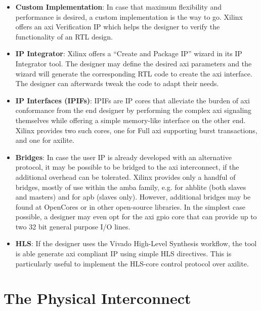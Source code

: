 \begin{itemize}
\item	\textbf{Custom Implementation}:
	In case that maximum flexibility and performance is desired,
	a custom implementation is the way to go.
	Xilinx offers an \gls{axi} Verification IP
	which helps the designer to verify the functionality of an RTL design.

\item	\textbf{IP Integrator}:
	Xilinx offers a ``Create and Package IP'' wizard in its IP Integrator tool.
	The designer may define the desired \gls{axi} parameters
	and the wizard will generate the corresponding RTL code
	to create the \gls{axi} interface.
	The designer can afterwards tweak the code to adapt their needs.

\item	\textbf{IP Interfaces (IPIFs)}:
	IPIFs are IP cores that alleviate the burden of \gls{axi} conformance
	from the end designer by performing the complex \gls{axi} signaling
	themselves while offering a simple memory-like interface on the other end.
	Xilinx provides two such cores, one for Full \gls{axi}
	supporting \gls{burst} transactions, and one for \gls{axilite}.

\item	\textbf{Bridges}: In case the user IP is already developed with an alternative protocol,
	it may be possible to be bridged to the \gls{axi} interconnect,
	if the additional overhead can be tolerated.
	Xilinx provides only a handful of bridges, mostly of use within the \gls{amba} family,
	e.g. for \gls{ahblite} (both slaves and masters) and for \gls{apb} (slaves only).
	However, additional bridges may be found at OpenCores or in other open-source libraries.
	In the simplest case possible, a designer may even opt for
	the \gls{axi} \gls{gpio} core that can provide up to two 32 bit general purpose I/O lines.

\item	\textbf{HLS}: If the designer uses the Vivado High-Level Synthesis workflow,
	the tool is able generate \gls{axi} compliant IP using simple HLS directives.
	This is particularly useful to implement the HLS-core control protocol over \gls{axilite}.
\end{itemize}

\section{The Physical Interconnect}
\label{sect:interconnect}

